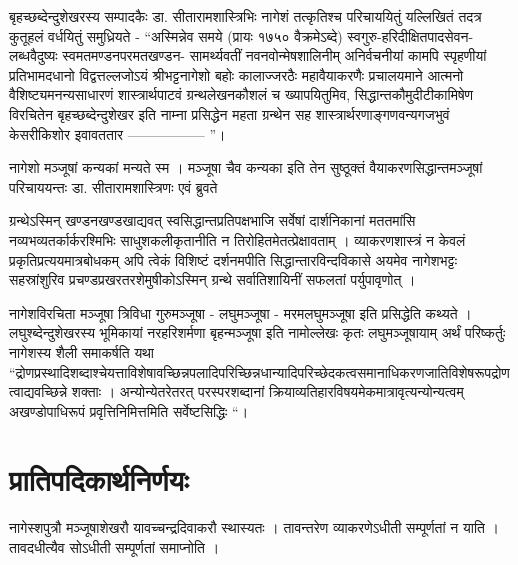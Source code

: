 बृहच्छब्देन्दुशेखरस्य सम्पादकैः डा. सीतारामशास्त्रिभिः नागेशं तत्कृतिश्च परिचाययितुं यल्लिखितं तदत्र कुतूहलं वर्धयितुं समुध्रियते - “अस्मिन्नेव समये (प्रायः १७५० वैक्रमेऽब्दे) स्वगुरु-हरिदीक्षितपादसेवन-लब्धवैदुष्यः स्वमतमण्डनपरमतखण्डन- सामर्थ्यवतीं नवनवोन्मेषशालिनीम् अनिर्वचनीयां कामपि स्पृहणीयां प्रतिभामदधानो विद्वत्तल्लजोऽयं श्रीभट्टनागेशो बहोः कालाज्जरठैः महावैयाकरणैः प्रचालयमाने आत्मनो वैशिष्ट्यमनन्यसाधारणं शास्त्रार्थपाटवं ग्रन्थलेखनकौशलं च ख्यापयितुमिव, सिद्धान्तकौमुदीटीकामिषेण विरचितेन बृहच्छब्देन्दुशेखर इति नाम्ना प्रसिद्धेन महता ग्रन्थेन सह शास्त्रार्थरणाङ्गणवन्यगजभुवं केसरीकिशोर इवावततार ----------------- ”।

नागेशो मञ्जूषां कन्यकां मन्यते स्म । मञ्जूषा चैव कन्यका इति तेन सुष्ठूक्तं वैयाकरणसिद्धान्तमञ्जूषां परिचाययन्तः डा. सीतारामशास्त्रिणः एवं ब्रुवते 

ग्रन्थेऽस्मिन् खण्डनखण्डखाद्यवत् स्वसिद्धान्तप्रतिपक्षभाजि सर्वेषां दार्शनिकानां मततमांसि नव्यभव्यतर्कार्करश्मिभिः साधुशकलीकृतानीति न तिरोहितमेतत्प्रेक्षावताम् । व्याकरणशास्त्रं न केवलं प्रकृतिप्रत्ययमात्रबोधकम् अपि त्वेकं विशिष्टं दर्शनमपीति सिद्धान्तारविन्दविकासे अयमेव नागेशभट्टः सहस्रांशुरिव प्रचण्डप्रखरतरशेमुषीकोऽस्मिन् ग्रन्थे सर्वातिशायिनीं सफलतां पर्युपावृणोत् ।

नागेशविरचिता मञ्जूषा त्रिविधा  गुरुमञ्जूषा - लघुमञ्जूषा - मरमलघुमञ्जूषा इति प्रसिद्धेति कथ्यते । लघुश्ब्देन्दुशेखरस्य भूमिकायां नरहरिशर्मणा बृहन्मञ्जूषा इति नामोल्लेखः कृतः लघुमञ्जूषायाम् अर्थं परिष्कर्तुः नागेशस्य शैली समाकर्षति यथा  “द्रोणप्रस्थादिशब्दाश्चेयत्ताविशेषावच्छिन्नपलादिपरिच्छिन्नधान्यादिपरिच्छेदकत्वसमानाधिकरणजातिविशेषरूपद्रोणत्वाद्यवच्छिन्ने शक्ताः । अन्योन्येतरेतरत् परस्परशब्दानां क्रियाव्यतिहारविषयमेकमात्रावृत्यन्योन्यत्वम् अखण्डोपाधिरूपं प्रवृत्तिनिमित्तमिति सर्वेष्टसिद्धिः “।

\section*{प्रातिपदिकार्थनिर्णयः}

नागेस्शपुत्रौ मञ्जूषाशेखरौ यावच्चन्द्रदिवाकरौ स्थास्यतः । तावन्तरेण व्याकरणेऽधीती सम्पूर्णतां न याति । तावदधीत्यैव सोऽधीती सम्पूर्णतां समाप्नोति ।
